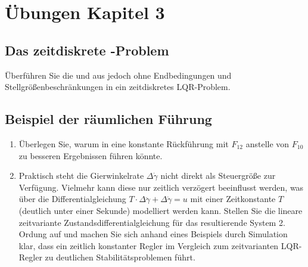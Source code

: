 \section*{Übungen Kapitel 3}
\label{sec:uebung_kapitel_3}

\subsection*{Das zeitdiskrete -Problem}
\label{sec:uebung_zeitdiskretes_lqr_problem}
Überführen Sie die \exmpref{} und \exmpref{} aus \secref{} jedoch ohne Endbedingungen und Stellgrößenbeschränkungen in ein zeitdiskretes \ac{LQR}-Problem.

\subsection*{Beispiel der räumlichen Führung}
\label{sec:uebung_raeumliche_fuehrung}
\begin{enumerate}
  \item Überlegen Sie, warum in  eine konstante Rückführung mit $F_{12}$ anstelle von $F_{10}$ zu besseren Ergebnissen führen könnte.
  \item Praktisch steht die Gierwinkelrate $\Delta\dot{\gamma}$ nicht direkt als Steuergröße zur Verfügung. Vielmehr kann diese nur zeitlich verzögert beeinflusst werden, was über die
  Differentialgleichung $T\cdot\Delta\ddot{\gamma}+\Delta\dot{\gamma}=u$ mit einer Zeitkonstante $T$ (deutlich unter einer Sekunde) modelliert werden kann. Stellen Sie die lineare
  zeitvariante Zustandsdifferentialgleichung für das resultierende System 2. Ordung auf und machen Sie sich anhand eines Beispiels durch Simulation klar, dass ein zeitlich konstanter
  Regler im Vergleich zum zeitvarianten \ac{LQR}-Regler zu deutlichen Stabilitätsproblemen führt.
\end{enumerate}